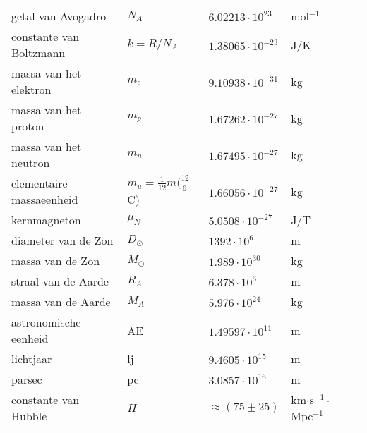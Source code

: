 \documentclass[dutch]{report}
\begin{document}
{\begin{tabular}{ l | l l l l}
        getal van Avogadro & $N_{A}$ & $6.02213\cdot10^{23}$&mol$^{-1}$ & \\
        constante van Boltzmann & $k=R/N_{A}$ & $1.38065\cdot10^{-23}$ & J/K & \\
        \hline
        massa van het elektron & $m_{
            e}$ & $9.10938\cdot10^{-31}$ & kg & \\
        massa van het proton & $m_{p}$ & $1.67262\cdot10^{-27}$ & kg & \\
        massa van het neutron & $m_{n}$ & $1.67495\cdot10^{-27}$ & kg & \\
        elementaire massaeenheid & $m_{
            u}=\frac{1}{12}m(^{12}_{~6}$C)&$1.66056\cdot10^{-27}$ & kg & \\
        kernmagneton & $\mu_{N}$ & $5.0508\cdot10^{-27}$ & J/T\\
        \hline
        diameter van de Zon & $D_\odot$ & $1392\cdot10^6$ & m & \\
        massa van de Zon & $M_\odot$ & $1.989\cdot10^{30}$ & kg & \\
        straal van de Aarde & $R_{A}$ & $6.378\cdot10^6$ & m & \\
        massa van de Aarde & $M_{A}$ & $5.976\cdot10^{24}$ & kg & \\
        astronomische eenheid & AE & $1.49597\cdot10^{11}$ & m & \\
        lichtjaar & lj & $9.4605\cdot10^{15}$ & m & \\
        parsec & pc & $3.0857\cdot10^{16}$ & m & \\
        constante van Hubble & $H$ & $\approx(75\pm25)$ & km$\cdot$s$^{-1}\cdot$Mpc$^{-1}$
        & \\
        \hline
    \end{tabular}
}
\end{document}
